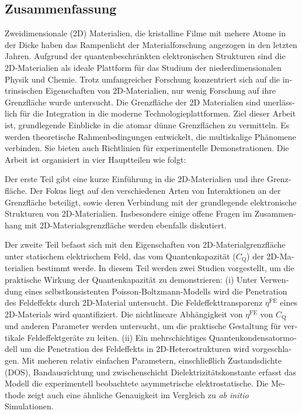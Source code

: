 \endgroup

\cleardoublepage%

\begingroup
\let\clearpage\relax
\let\cleardoublepage\relax
\let\cleardoublepage\relax

\begin{otherlanguage}{ngerman}
\chapter*{Zusammenfassung}

Zweidimensionale (2D) Materialien, die kristalline Filme mit mehere Atome in der Dicke haben das Rampenlicht der Materialforschung angezogen
in den letzten Jahren.
%
Aufgrund der quantenbeschränkten elektronischen Strukturen sind die 2D-Materialien
als ideale Plattform für das Studium der niederdimensionalen Physik und
Chemie.
%
Trotz umfangreicher Forschung konzentriert sich auf die intrinsischen Eigenschaften
von 2D-Materialien, nur wenig Forschung auf ihre Grenzfläche wurde untersucht.
Die Grenzfläche der 2D Materialien sind unerlässlich für die Integration in die moderne
Technologieplattformen.
%
Ziel dieser Arbeit ist, grundlegende Einblicke in die
atomar dünne Grenzflächen zu vermitteln.
Es werden theoretische Rahmenbedingungen entwickelt, die multiskalige Phänomene verbinden.
Sie bieten auch Richtlinien für experimentelle
Demonstrationen.
Die Arbeit ist organisiert
in vier Hauptteilen wie folgt:

Der erste Teil gibt eine kurze Einführung in die 2D-Materialien und
ihre Grenzfläche.
%
Der Fokus liegt auf den verschiedenen Arten von Interaktionen
an der Grenzfläche beteiligt, sowie deren Verbindung mit der
grundlegende elektronische Strukturen von 2D-Materialien.
%
Insbesondere einige offene Fragen im Zusammenhang mit
2D-Materialsgrenzfläche werden ebenfalls diskutiert.

Der zweite Teil befasst sich mit den Eigenschaften von
2D-Materialgrenzfläche unter statischem elektrischem Feld, das vom
Quantenkapazität ($C_{\mathrm{Q}}$) der 2D-Materialien bestimmt
werde.
%
In diesem Teil werden zwei Studien vorgestellt, um die praktische Wirkung der Quantenkapazität zu demonstrieren:
%
(i) Unter Verwendung eines selbstkonsistenten
Poisson-Boltzmann-Modells wird die Penetration des Feldeffekts durch
2D-Material untersucht. Die Feldeffekttransparenz $\eta^{\mathrm{FE}}$
eines 2D-Materials wird quantifiziert. Die nichtlineare Abhängigkeit
von $\eta^{\mathrm{FE}}$ von $C_{\mathrm{Q}}$ und anderen Parameter
werden untersucht, um die praktische Gestaltung für vertikale
Feldeffektgeräte zu leiten.
%
(ii) Ein mehrschichtiges Quantenkondensatormodell um die
Penetration des Feldeffekts in 2D-Heterostrukturen wird vorgeschlagen.
%
Mit meheren relativ einfachen Parametern, einschließlich Zustandsdichte (DOS), Bandausrichtung
und zwischenschicht Dielektrizitätskonstante erfasst das Modell die
experimentell beobachtete asymmetrische elektrostatische.
Die Methode zeigt auch eine ähnliche Genauigkeit im Vergleich zu \textit{ab initio}
Simulationen.


\end{otherlanguage}
